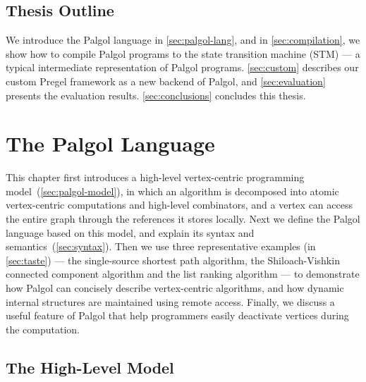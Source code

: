 \documentclass{sokendai_thesis} %
\begin{document}
\section{Thesis Outline}

We introduce the Palgol language in \autoref{sec:palgol-lang}, and in \autoref{sec:compilation}, we show how to compile Palgol programs to the state transition machine (STM) --- a typical intermediate representation of Palgol programs.
\autoref{sec:custom} describes our custom Pregel framework as a new backend of Palgol, and \autoref{sec:evaluation} presents the evaluation results.
\autoref{sec:conclusions} concludes this thesis.

\chapter{The Palgol Language}
\label{sec:palgol-lang}

This chapter first introduces a high-level vertex-centric programming model~(\autoref{sec:palgol-model}), in which an algorithm is decomposed into atomic vertex-centric computations and high-level combinators, and a vertex can access the entire graph through the references it stores locally.
Next we define the Palgol language based on this model, and explain its syntax and semantics~(\autoref{sec:syntax}).
Then we use three representative examples (in \autoref{sec:taste}) --- the single-source shortest path algorithm, the Shiloach-Vishkin connected component algorithm and the list ranking algorithm --- to demonstrate how Palgol can concisely describe vertex-centric algorithms, and how dynamic internal structures are maintained using remote access.
Finally, we discuss a useful feature of Palgol that help programmers easily deactivate vertices during the computation.


\section{The High-Level Model}
\label{sec:palgol-model}
\end{document}
